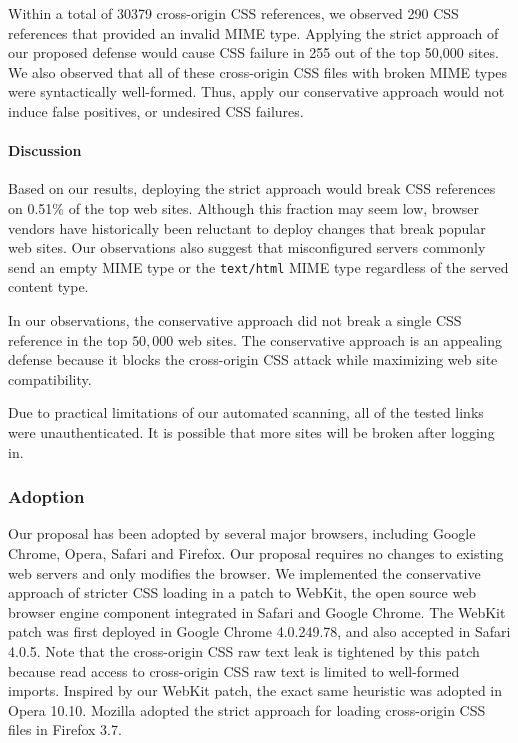 \documentclass{acm_proc_article-sp}
\begin{document}
Within a total of 30379 cross-origin CSS references, we observed 290 CSS references that provided an invalid MIME type. Applying the strict approach of our proposed defense would cause CSS failure in 255 out of the top 50,000 sites. We also observed that all of these cross-origin CSS files with broken MIME types were syntactically well-formed. Thus, apply our conservative approach would not induce false positives, or undesired CSS failures.


\paragraph{Discussion}
Based on our results, deploying the strict approach would break CSS references on 0.51\% of the top web sites. Although this fraction may seem low, browser vendors have historically been reluctant to deploy changes that break popular web sites. Our observations also suggest that misconfigured servers commonly send an empty MIME type or the \texttt{text/html} MIME type regardless of the served content type.

In our observations, the conservative approach did not break a single CSS reference in the top $50,000$ web sites. The conservative approach is an appealing defense because it blocks the cross-origin CSS attack while maximizing web site compatibility.

Due to practical limitations of our automated scanning, all of the tested links were unauthenticated. It is possible that more sites will be broken after logging in.

\subsubsection{Adoption}
Our proposal has been adopted by several major browsers, including Google Chrome, Opera, Safari and Firefox. Our proposal requires no changes to existing web servers and only modifies the browser. We implemented the conservative approach of stricter CSS loading in a patch to WebKit, the open source web browser engine component integrated in Safari and Google Chrome. The WebKit patch was first deployed in Google Chrome 4.0.249.78, and also accepted in Safari 4.0.5. Note that the cross-origin CSS raw text leak is tightened by this patch because read access to cross-origin CSS raw text is limited to well-formed imports. Inspired by our WebKit patch, the exact same heuristic was adopted in Opera 10.10. Mozilla adopted the strict approach for loading cross-origin CSS files in Firefox 3.7.
\end{document}
